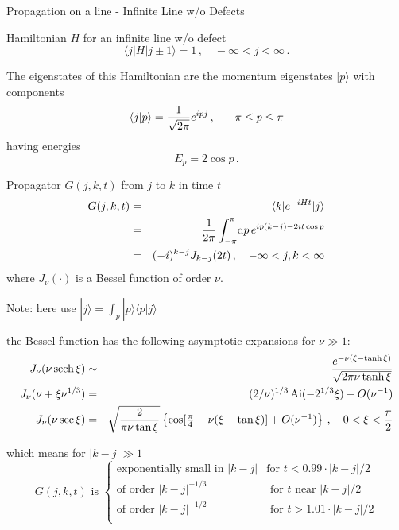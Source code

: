 \documentclass{beamer}
\newcommand{\<}{\langle}
\renewcommand{\>}{\rangle}
\newcommand{\be}{\begin{equation}}
\newcommand{\ee}{\end{equation}}
\newcommand{\bea}{\begin{eqnarray}}
\newcommand{\eea}{\end{eqnarray}}
\renewcommand{\d}{{\mathrm{d}}}
\newcommand{\sech}{\mathop{\mathrm{sech}}\nolimits}
\newcommand{\Ai}{\mathop{\mathrm{Ai}}\nolimits}
\begin{document}
\begin{frame}[allowframebreaks]{Propagation on a line - Infinite Line w/o Defects}

\begin{block}{Hamiltonian $H$ for an infinite line w/o defect}
\be
  \<j|H|j\pm 1\> = 1 \,,\quad -\infty < j < \infty
\,.
\ee
\end{block}
The eigenstates of this Hamiltonian are the momentum eigenstates $|p\>$ with components
\be
  \<j|p\> = {1 \over \sqrt{2\pi}} e^{i p j}
  \,, \quad -\pi \le p \le \pi
\ee
having energies
\be
  E_p = 2 \cos p 
\,.
\ee

\framebreak

\begin{block}{Propagator $G(j, k, t)$ from $j$ to $k$ in time $t$}
\bea
\label{eq:green}
  G(j,k,t) &=& \<k|e^{-i H t}|j\> \\
           &=& {1 \over 2 \pi} \int_{-\pi}^\pi \! \d p \, 
	       e^{i p (k-j) - 2 i t \cos p} \\
	   &=& (-i)^{k-j} J_{k-j}(2t) \,,\quad -\infty < j,k < \infty
\eea
where $J_\nu(\cdot)$ is a Bessel function of order $\nu$.
\newline
\end{block}
Note: here use $|j\> = \int_p |p\>\<p|j\>$

\framebreak

the Bessel function has the following asymptotic expansions for
$\nu \gg 1$:
\footnotesize
\bea
  J_\nu(\nu \sech \xi) 
    &\sim& {e^{-\nu(\xi-\tanh \xi)} \over \sqrt{2 \pi \nu \tanh \xi}} 
    \label{eq:besselahead} \\
  J_\nu(\nu+\xi\nu^{1/3}) 
    &=& (2/\nu)^{1/3} \Ai(-2^{1/3}\xi) + O(\nu^{-1})
    \label{eq:besseledge} \\
  J_\nu(\nu \sec \xi)
       &=& \sqrt{2 \over \pi \nu \tan\xi} \left\{
           \cos[\textstyle{\pi \over 4}-\nu(\xi-\tan \xi)] + O(\nu^{-1})
	   \right\}
           \,, \quad 0 < \xi < {\pi \over 2} \label{eq:besselbehind}
\eea
\normalsize

which means for $|k-j| \gg 1$
\[
 G(j, k, t) \text{ is } 
  \begin{cases} 
   \text{exponentially small in } |k-j| & \text{for } t <0.99\cdot |k-j|/2 \\
   \text{of order }|k-j|^{-1/3} & \text{ for }t\text{ near }|k-j|/2 \\
   \text{of order }|k-j|^{-1/2} & \text{ for }t >1.01\cdot |k-j|/2 \\
  \end{cases}
\]

\end{frame}
\end{document}
